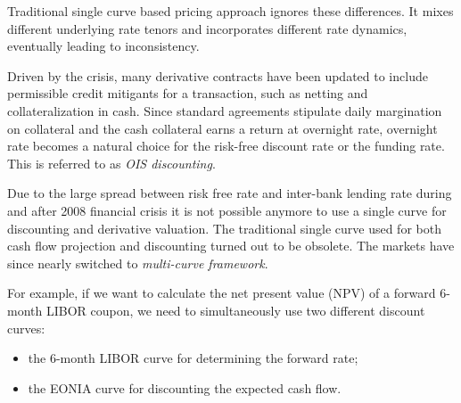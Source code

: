 Traditional single curve based pricing approach ignores these differences. It mixes different underlying rate tenors and incorporates different rate dynamics, eventually leading to inconsistency.

Driven by the crisis, many derivative contracts have been updated to include permissible credit mitigants for a transaction, such as netting and collateralization in cash. Since standard agreements stipulate daily margination on collateral and the cash collateral earns a return at overnight rate, overnight rate becomes a natural choice for the risk-free discount rate or the funding rate. This is referred to as \emph{OIS discounting}.

Due to the large spread between risk free rate and inter-bank lending rate during and after 2008 financial crisis it is not possible anymore to use a single curve for discounting and derivative valuation. The traditional single curve used for both cash flow projection and discounting turned out to be obsolete. The markets have since nearly switched to \emph{multi-curve framework}. 

For example, if we want to calculate the net present value (NPV) of a forward 6-month LIBOR coupon, we need to simultaneously use two different discount curves: 

\begin{itemize}
\tightlist
\item the 6-month LIBOR curve for determining the forward rate;
\item the EONIA curve for discounting the expected cash flow.
\end{itemize}


